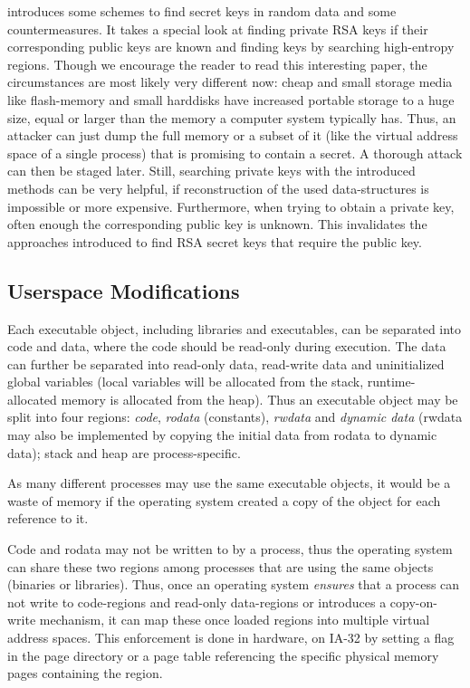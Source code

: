 \cite{hide_n_seek:1998} introduces some schemes to find secret keys in random
data and some countermeasures. It takes a special look at finding private RSA
keys if their corresponding public keys are known and finding keys by searching
high-entropy regions. Though we encourage the reader to read this interesting
paper, the circumstances are most likely very different now: cheap and small
storage media like flash-memory and small harddisks have increased portable
storage to a huge size, equal or larger than the memory a computer system
typically has. Thus, an attacker can just dump the full memory or a subset of it
(like the virtual address space of a single process) that is promising to
contain a secret. A thorough attack can then be staged later. Still, searching
private keys with the introduced methods can be very helpful, if reconstruction
of the used data-structures is impossible or more expensive. Furthermore, when
trying to obtain a private key, often enough the corresponding public key is
unknown. This invalidates the approaches introduced to find RSA secret keys that
require the public key.




\subsection{Userspace Modifications}

\label{userspace_attacks}

Each executable object, including libraries and executables, can be separated
into code and data, where the code should be read-only during execution. The
data can further be separated into read-only data, read-write data and
uninitialized global variables (local variables will be allocated from the
stack, runtime-allocated memory is allocated from the heap). Thus an executable
object may be split into four regions: \emph{code}, \emph{rodata} (constants),
\emph{rwdata} and \emph{dynamic data} (rwdata may also be implemented by copying
the initial data from rodata to dynamic data); stack and heap are
process-specific.

As many different processes may use the same executable objects, it would be a
waste of memory if the operating system created a copy of the object for each
reference to it.

Code and rodata may not be written to by a process, thus the operating system
can share these two regions among processes that are using the same objects
(binaries or libraries). Thus, once an operating system \emph{ensures} that a
process can not write to code-regions and read-only data-regions or introduces a
copy-on-write mechanism, it can map these once loaded regions into multiple
virtual address spaces. This enforcement is done in hardware, on IA-32 by
setting a flag in the page directory or a page table referencing the specific
physical memory pages containing the region.

